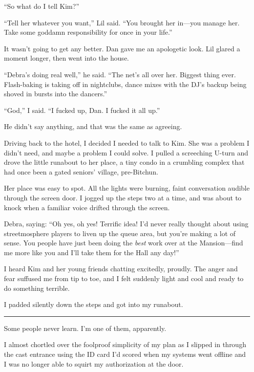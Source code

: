 “So what do I tell Kim?”

“Tell her whatever you want,” Lil said. “You brought her in—you
manage her. Take some goddamn responsibility for once in your
life.”

It wasn't going to get any better. Dan gave me an apologetic look.
Lil glared a moment longer, then went into the house.

“Debra's doing real well,” he said. “The net's all over her.
Biggest thing ever. Flash-baking is taking off in nightclubs, dance
mixes with the DJ's backup being shoved in bursts into the
dancers.”

“God,” I said. “I fucked up, Dan. I fucked it all up.”

He didn't say anything, and that was the same as agreeing.

Driving back to the hotel, I decided I needed to talk to Kim. She
was a problem I didn't need, and maybe a problem I could solve. I
pulled a screeching U-turn and drove the little runabout to her
place, a tiny condo in a crumbling complex that had once been a
gated seniors' village, pre-Bitchun.

Her place was easy to spot. All the lights were burning, faint
conversation audible through the screen door. I jogged up the steps
two at a time, and was about to knock when a familiar voice drifted
through the screen.

Debra, saying: “Oh yes, oh yes! Terrific idea! I'd never really
thought about using streetmosphere players to liven up the queue
area, but you're making a lot of sense. You people have just been
doing the \emph{best} work over at the Mansion—find me more like
you and I'll take them for the Hall any day!”

I heard Kim and her young friends chatting excitedly, proudly. The
anger and fear suffused me from tip to toe, and I felt suddenly
light and cool and ready to do something terrible.

I padded silently down the steps and got into my runabout.

\begin{center}\rule{3in}{0.4pt}\end{center}

Some people never learn. I'm one of them, apparently.

I almost chortled over the foolproof simplicity of my plan as I
slipped in through the cast entrance using the ID card I'd scored
when my systems went offline and I was no longer able to squirt my
authorization at the door.

